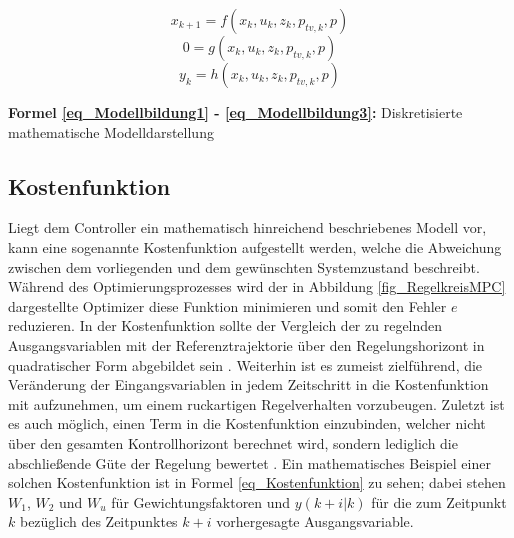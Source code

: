 \begin{equation} \label{eq_Modellbildung1}
    x_{k+1} = f(x_k, u_k, z_k, p_{tv,k}, p)
\end{equation}
\vspace*{-2.5\baselineskip}
\begin{equation} \label{eq_Modellbildung2}
    0 = g(x_k, u_k, z_k, p_{tv,k}, p)
\end{equation}
\vspace*{-2.5\baselineskip}
\begin{equation} \label{eq_Modellbildung3}
    y_k = h(x_k, u_k, z_k, p_{tv,k}, p)
\end{equation}
\centerline{\small{\textsf{\textbf{Formel \ref{eq_Modellbildung1} - \ref{eq_Modellbildung3}:}} Diskretisierte mathematische Modelldarstellung}}


\subsection{Kostenfunktion} \label{subsec_Kostenfunktion}
Liegt dem Controller ein mathematisch hinreichend beschriebenes Modell vor, kann eine sogenannte Kostenfunktion aufgestellt werden, welche die Abweichung zwischen dem vorliegenden und dem gewünschten Systemzustand beschreibt.
Während des Optimierungsprozesses wird der in Abbildung \ref{fig_RegelkreisMPC} dargestellte Optimizer diese Funktion minimieren und somit den Fehler $e$ reduzieren.
In der Kostenfunktion sollte der Vergleich der zu regelnden Ausgangsvariablen mit der Referenztrajektorie über den Regelungshorizont in quadratischer Form abgebildet sein \cite[S.24]{Diehl}\cite[S.3]{Schwenzer}.
Weiterhin ist es zumeist zielführend, die Veränderung der Eingangsvariablen in jedem Zeitschritt in die Kostenfunktion mit aufzunehmen, um einem ruckartigen Regelverhalten vorzubeugen.
Zuletzt ist es auch möglich, einen Term in die Kostenfunktion einzubinden, welcher nicht über den gesamten Kontrollhorizont berechnet wird, sondern lediglich die abschließende Güte der Regelung bewertet \cite[S.24]{Diehl}.
Ein mathematisches Beispiel einer solchen Kostenfunktion ist in Formel \ref{eq_Kostenfunktion} zu sehen; dabei stehen $W_1$, $W_2$ und $W_u$ für Gewichtungsfaktoren und $y(k+i\rvert k)$ für die zum Zeitpunkt $k$ bezüglich des Zeitpunktes $k+i$ vorhergesagte Ausgangsvariable. \cite[S.3]{Schwenzer}

